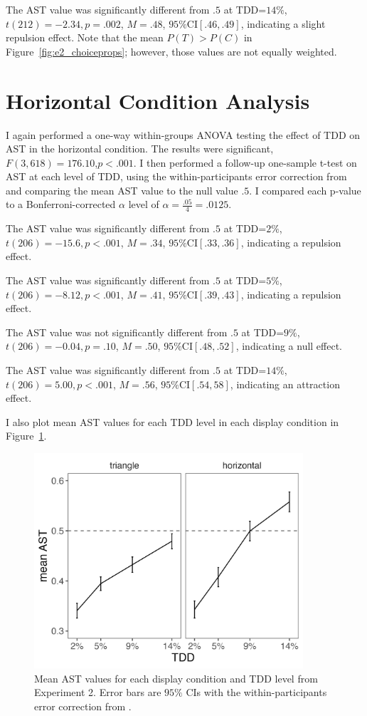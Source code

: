 The AST value was significantly different from $.5$ at TDD=$14\%$, $\textit{t}(212)=-2.34,\textit{p}=.002$, $\textit{M}=.48$, $95\%\text{CI}[.46,.49]$, indicating a slight repulsion effect. Note that the mean $P(T)>P(C)$ in Figure~\ref{fig:e2_choiceprops}; however, those values are not equally weighted.

\section{Horizontal Condition Analysis}
I again performed a one-way within-groups ANOVA testing the effect of TDD on AST in the horizontal condition. The results were significant, $\textit{F}(3,618)=176.10$,$\textit{p}<.001$. 
I then performed a follow-up one-sample t-test on AST at each level of TDD, using the within-participants error correction from \textcite{cousineau2014error} and comparing the mean AST value to the null value $.5$. I compared each p-value to a Bonferroni-corrected $\alpha$ level of $\alpha=\frac{.05}{4}=.0125$. 

The AST value was significantly different from $.5$ at TDD=$2\%$, $\textit{t}(206)=-15.6,\textit{p}<.001$, $\textit{M}=.34$, $95\%\text{CI}[.33,.36]$, indicating a repulsion effect. 

The AST value was significantly different from $.5$ at TDD=$5\%$, $\textit{t}(206)=-8.12,\textit{p}<.001$, $\textit{M}=.41$, $95\%\text{CI}[.39,.43]$, indicating a repulsion effect. 

The AST value was not significantly different from $.5$ at TDD=$9\%$, $\textit{t}(206)=-0.04,\textit{p}=.10$, $\textit{M}=.50$, $95\%\text{CI}[.48,.52]$, indicating a null effect. 

The AST value was significantly different from $.5$ at TDD=$14\%$, $\textit{t}(206)=5.00,\textit{p}<.001$, $\textit{M}=.56$, $95\%\text{CI}[.54,58]$, indicating an attraction effect. 

I also plot mean AST values for each TDD level in each display condition in Figure~\ref{fig:e2_ast}.

\begin{figure}
   \includegraphics[width=100mm]{figures/choicePhase_mean_ast.jpeg}
   \caption{Mean AST values for each display condition and TDD level from Experiment 2. Error bars are $95\%$ CIs with the within-participants error correction from \textcite{cousineau2014error}.}
   \label{fig:e2_ast}
\end{figure}

